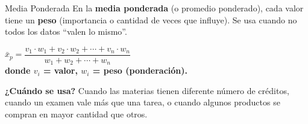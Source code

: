 \documentclass[12pt, letterpaper]{article}
\begin{document}
	\begin{concepto}{Media Ponderada}
		En la \textbf{media ponderada} (o promedio ponderado), cada valor tiene
		un \textbf{peso} (importancia o cantidad de veces que influye).
		Se usa cuando no todos los datos ``valen lo mismo''.
		
		\vspace{0.3cm}
		\begin{center}
			\begin{tcolorbox}[enhanced, colback=vallightorange, colframe=valorange,
				arc=3pt, width=0.85\textwidth]
				\centering\Large\bfseries
				$\bar{x}_p = \dfrac{v_1 \cdot w_1 + v_2 \cdot w_2 + \cdots + v_n \cdot w_n}
				{w_1 + w_2 + \cdots + w_n}$\\[6pt]
				\normalsize\normalfont
				donde $v_i$ = valor, $w_i$ = peso (ponderación).
			\end{tcolorbox}
		\end{center}
		
		\vspace{0.3cm}
		\textbf{¿Cuándo se usa?}
		Cuando las materias tienen diferente número de créditos, cuando un
		examen vale más que una tarea, o cuando algunos productos se compran
		en mayor cantidad que otros.
	\end{concepto}
	\newpage
\end{document}
